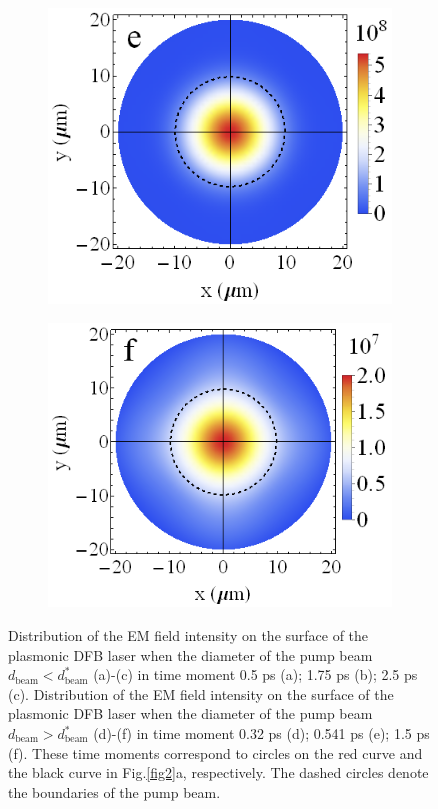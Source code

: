 \documentclass[aps,pra,amsmath,amssymb,onecolumn,superscriptaddress,showpacs,floatfix,]{revtex4-1}
\begin{document}
\begin{figure}[h]
\begin{subfigure}[h]{0.32\linewidth}
		\includegraphics[width=\linewidth]{Fig3e.png}
	\end{subfigure}
	\begin{subfigure}[h]{0.32\linewidth}
		\includegraphics[width=\linewidth]{Fig3f.png}
	\end{subfigure}
	\caption{Distribution of the EM field intensity on the surface of the plasmonic DFB laser when the diameter of the pump beam $d_{\text{beam}}<d_{\text{beam}}^*$ (a)-(c) in time moment 0.5 ps (a); 1.75 ps (b); 2.5 ps (c). Distribution of the EM field intensity on the surface of the plasmonic DFB laser when the diameter of the pump beam $d_{\text{beam}}>d_{\text{beam}}^*$ (d)-(f) in time moment 0.32 ps (d); 0.541 ps (e); 1.5 ps (f). These time moments correspond to circles on the red curve and the black curve in Fig.\ref{fig2}a, respectively. The dashed circles denote the boundaries of the pump beam.}
	\label{fig3}	
\end{figure}
\end{document}
